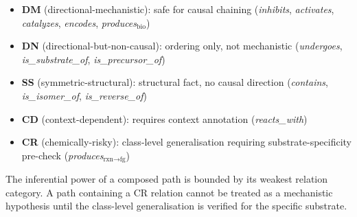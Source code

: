 \begin{itemize}[noitemsep]
  \item \textbf{DM} (directional-mechanistic): safe for causal chaining
    (\textit{inhibits}, \textit{activates}, \textit{catalyzes}, \textit{encodes},
    \textit{produces}$_{\text{bio}}$)
  \item \textbf{DN} (directional-but-non-causal): ordering only, not mechanistic
    (\textit{undergoes}, \textit{is\_substrate\_of}, \textit{is\_precursor\_of})
  \item \textbf{SS} (symmetric-structural): structural fact, no causal direction
    (\textit{contains}, \textit{is\_isomer\_of}, \textit{is\_reverse\_of})
  \item \textbf{CD} (context-dependent): requires context annotation
    (\textit{reacts\_with})
  \item \textbf{CR} (chemically-risky): class-level generalisation requiring
    substrate-specificity pre-check
    (\textit{produces}$_{\text{rxn} \to \text{fg}}$)
\end{itemize}

The inferential power of a composed path is bounded by its weakest relation
category.
A path containing a CR relation cannot be treated as a mechanistic hypothesis
until the class-level generalisation is verified for the specific substrate.
